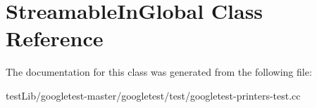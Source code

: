 \hypertarget{classStreamableInGlobal}{}\section{Streamable\+In\+Global Class Reference}
\label{classStreamableInGlobal}


The documentation for this class was generated from the following file\+:\begin{DoxyCompactItemize}
\item 
test\+Lib/googletest-\/master/googletest/test/googletest-\/printers-\/test.\+cc\end{DoxyCompactItemize}
